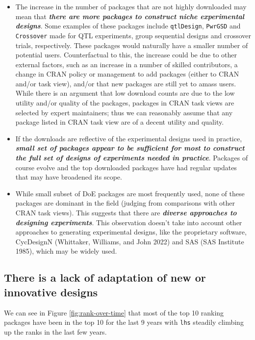 \documentclass{article}
\providecommand{\tightlist}{%
  \setlength{\itemsep}{0pt}\setlength{\parskip}{0pt}}
\def\tightlist{}
\begin{document}
\begin{itemize}
\tightlist
\item
  The increase in the number of packages that are not highly downloaded
  may mean that \textbf{\emph{there are more packages to construct niche
  experimental designs}}. Some examples of these packages include
  \texttt{qtlDesign}, \texttt{PwrGSD} and \texttt{Crossover} made for
  QTL experiments, group sequential designs and crossover trials,
  respectively. These packages would naturally have a smaller number of
  potential users. Counterfactual to this, the increase could be due to
  other external factors, such as an increase in a number of skilled
  contributors, a change in CRAN policy or management to add packages
  (either to CRAN and/or task view), and/or that new packages are still
  yet to amass users. While there is an argument that low download
  counts are due to the low utility and/or quality of the packages,
  packages in CRAN task views are selected by expert maintainers; thus
  we can reasonably assume that any package listed in CRAN task view are
  of a decent utility and quality.
\item
  If the downloads are reflective of the experimental designs used in
  practice, \textbf{\emph{small set of packages appear to be sufficient
  for most to construct the full set of designs of experiments needed in
  practice}}. Packages of course evolve and the top downloaded packages
  have had regular updates that may have broadened its scope.
\item
  While small subset of DoE packages are most frequently used, none of
  these packages are dominant in the field (judging from comparisons
  with other CRAN task views). This suggests that there are
  \textbf{\emph{diverse approaches to designing experiments}}. This
  observation doesn't take into account other approaches to generating
  experimental designs, like the proprietary software, CycDesignN
  (Whittaker, Williams, and John 2022) and SAS (SAS Institute 1985),
  which may be widely used.
\end{itemize}

\hypertarget{ranking}{%
\subsection{There is a lack of adaptation of new or innovative
designs}\label{ranking}}

We can see in Figure \ref{fig:rank-over-time} that most of the top 10
ranking packages have been in the top 10 for the last 9 years with
\texttt{lhs} steadily climbing up the ranks in the last few years.
\end{document}
